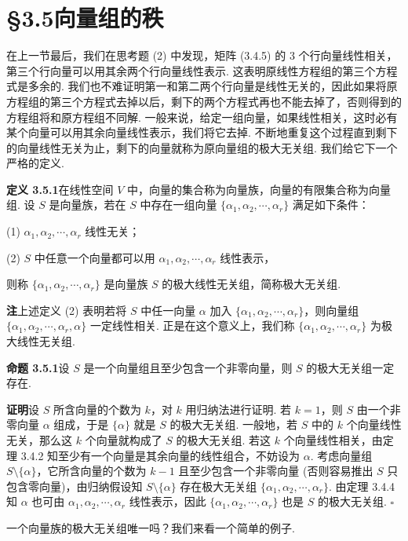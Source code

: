 \documentclass[UTF8,12pt,a4paper,fontset=fandol]{ctexart}
\begin{document}
\section*{§3.5\quad 向量组的秩}

在上一节最后，我们在思考题 (2) 中发现，矩阵 (3.4.5) 的 3 个行向量线性相关，第三个行向量可以用其余两个行向量线性表示. 这表明原线性方程组的第三个方程式是多余的. 我们也不难证明第一和第二两个行向量是线性无关的，因此如果将原方程组的第三个方程式去掉以后，剩下的两个方程式再也不能去掉了，否则得到的方程组将和原方程组不同解. 一般来说，给定一组向量，如果线性相关，这时必有某个向量可以用其余向量线性表示，我们将它去掉. 不断地重复这个过程直到剩下的向量线性无关为止，剩下的向量就称为原向量组的极大无关组. 我们给它下一个严格的定义.

\noindent\textbf{定义 3.5.1}\quad 在线性空间 $V$ 中，向量的集合称为向量族，向量的有限集合称为向量组. 设 $S$ 是向量族，若在 $S$ 中存在一组向量 $\{\alpha_1,\alpha_2,\cdots,\alpha_r\}$ 满足如下条件：

(1) $\alpha_1,\alpha_2,\cdots,\alpha_r$ 线性无关；

(2) $S$ 中任意一个向量都可以用 $\alpha_1,\alpha_2,\cdots,\alpha_r$ 线性表示，

则称 $\{\alpha_1,\alpha_2,\cdots,\alpha_r\}$ 是向量族 $S$ 的极大线性无关组，简称极大无关组.

\noindent\textbf{注}\quad 上述定义 (2) 表明若将 $S$ 中任一向量 $\alpha$ 加入 $\{\alpha_1,\alpha_2,\cdots,\alpha_r\}$，则向量组 $\{\alpha_1,\alpha_2,\cdots,\alpha_r,\alpha\}$ 一定线性相关. 正是在这个意义上，我们称 $\{\alpha_1,\alpha_2,\cdots,\alpha_r\}$ 为极大线性无关组.

\noindent\textbf{命题 3.5.1}\quad 设 $S$ 是一个向量组且至少包含一个非零向量，则 $S$ 的极大无关组一定存在.

\noindent\textbf{证明}\quad 设 $S$ 所含向量的个数为 $k$，对 $k$ 用归纳法进行证明. 若 $k=1$，则 $S$ 由一个非零向量 $\alpha$ 组成，于是 $\{\alpha\}$ 就是 $S$ 的极大无关组. 一般地，若 $S$ 中的 $k$ 个向量线性无关，那么这 $k$ 个向量就构成了 $S$ 的极大无关组. 若这 $k$ 个向量线性相关，由定理 3.4.2 知至少有一个向量是其余向量的线性组合，不妨设为 $\alpha$. 考虑向量组 $S\setminus\{\alpha\}$，它所含向量的个数为 $k-1$ 且至少包含一个非零向量 (否则容易推出 $S$ 只包含零向量)，由归纳假设知 $S\setminus\{\alpha\}$ 存在极大无关组 $\{\alpha_1,\alpha_2,\cdots,\alpha_r\}$. 由定理 3.4.4 知 $\alpha$ 也可由 $\alpha_1,\alpha_2,\cdots,\alpha_r$ 线性表示，因此 $\{\alpha_1,\alpha_2,\cdots,\alpha_r\}$ 也是 $S$ 的极大无关组. $\square$

一个向量族的极大无关组唯一吗？我们来看一个简单的例子.
\end{document}
